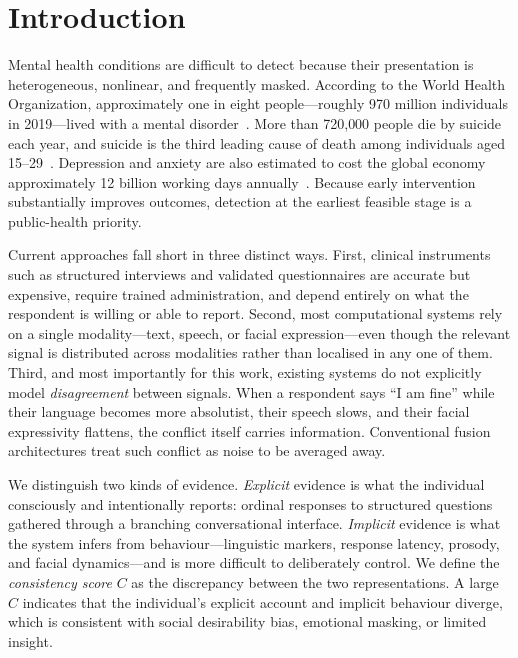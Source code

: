 \documentclass[12pt]{article}
\begin{document}
\section{Introduction}

Mental health conditions are difficult to detect because their
presentation is heterogeneous, nonlinear, and frequently masked.
According to the World Health Organization, approximately one in eight
people---roughly 970 million individuals in 2019---lived with a mental
disorder~\cite{who2022wmhr}. More than 720{,}000 people die by suicide
each year, and suicide is the third leading cause of death among
individuals aged 15--29~\cite{who2024suicide}. Depression and anxiety
are also estimated to cost the global economy approximately 12 billion
working days annually~\cite{who2022work}. Because early intervention
substantially improves outcomes, detection at the earliest feasible
stage is a public-health priority.

Current approaches fall short in three distinct ways. First, clinical
instruments such as structured interviews and validated questionnaires
are accurate but expensive, require trained administration, and depend
entirely on what the respondent is willing or able to report. Second,
most computational systems rely on a single modality---text, speech, or
facial expression---even though the relevant signal is distributed
across modalities rather than localised in any one of them. Third, and
most importantly for this work, existing systems do not explicitly
model \emph{disagreement} between signals. When a respondent says ``I am
fine'' while their language becomes more absolutist, their speech slows,
and their facial expressivity flattens, the conflict itself carries
information. Conventional fusion architectures treat such conflict as
noise to be averaged away.

We distinguish two kinds of evidence. \emph{Explicit} evidence is what
the individual consciously and intentionally reports: ordinal responses
to structured questions gathered through a branching conversational
interface. \emph{Implicit} evidence is what the system infers from
behaviour---linguistic markers, response latency, prosody, and facial
dynamics---and is more difficult to deliberately control. We define the
\emph{consistency score} $C$ as the discrepancy between the two
representations. A large $C$ indicates that the individual's explicit
account and implicit behaviour diverge, which is consistent with social
desirability bias, emotional masking, or limited insight.
\end{document}
